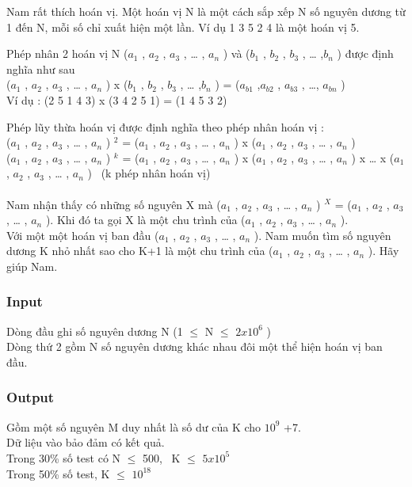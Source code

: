 

Nam rất thích hoán vị. Một hoán vị N là một cách sắp xếp N số nguyên dương từ 1 đến N, mỗi số chỉ xuất hiện một lần. Ví dụ 1 3 5 2 4 là một hoán vị 5.

Phép nhân 2 hoán vị N ($a_{1}$ , $a_{2}$ , $a_{3}$ , … , $a_{n}$ ) và ($b_{1}$ , $b_{2}$ , $b_{3}$ , … ,$b_{n}$ ) được định nghĩa như sau
\\($a_{1}$ , $a_{2}$ , $a_{3}$ , … , $a_{n}$ ) x ($b_{1}$ , $b_{2}$ , $b_{3}$ , … ,$b_{n}$ ) = ($a_{b1}$ ,$a_{b2}$ , $a_{b3}$ , …, $a_{bn}$ )
\\Ví dụ : (2 5 1 4 3) x (3 4 2 5 1) = (1 4 5 3 2)

Phép lũy thừa hoán vị được định nghĩa theo phép nhân hoán vị :
\\($a_{1}$ , $a_{2}$ , $a_{3}$ , … , $a_{n}$ ) $^ 2 $ = ($a_{1}$ , $a_{2}$ , $a_{3}$ , … , $a_{n}$ ) x ($a_{1}$ , $a_{2}$ , $a_{3}$ , … , $a_{n}$ )
\\($a_{1}$ , $a_{2}$ , $a_{3}$ , … , $a_{n}$ ) $^ k $ = ($a_{1}$ , $a_{2}$ , $a_{3}$ , … , $a_{n}$ ) x ($a_{1}$ , $a_{2}$ , $a_{3}$ , … , $a_{n}$ ) x … x ($a_{1}$ , $a_{2}$ , $a_{3}$ , … , $a_{n}$ )  (k phép nhân hoán vị)
\\
\\Nam nhận thấy có những số nguyên X mà ($a_{1}$ , $a_{2}$ , $a_{3}$ , … , $a_{n}$ ) $^ X $ = ($a_{1}$ , $a_{2}$ , $a_{3}$ , … , $a_{n}$ ). Khi đó ta gọi X là một chu trình của ($a_{1}$ , $a_{2}$ , $a_{3}$ , … , $a_{n}$ ).
\\Với một một hoán vị ban đầu ($a_{1}$ , $a_{2}$ , $a_{3}$ , … , $a_{n}$ ). Nam muốn tìm số nguyên dương K nhỏ nhất sao cho K+1 là một chu trình của ($a_{1}$ , $a_{2}$ , $a_{3}$ , … , $a_{n}$ ). Hãy giúp Nam.

\subsubsection{Input}

Dòng đầu ghi số nguyên dương N (1  $\le$  N  $\le$  $2x10^{6}$ )
\\Dòng thứ 2 gồm N số nguyên dương khác nhau đôi một thể hiện hoán vị ban đầu.

\subsubsection{Output}

Gồm một số nguyên M duy nhất là số dư của K cho $10^{9}$ +7.
\\Dữ liệu vào bảo đảm có kết quả.
\\Trong 30\% số test có N  $\le$  500,  K  $\le$  $5x10^{5}$
\\Trong 50\% số test, K  $\le$  $10^{18}$

